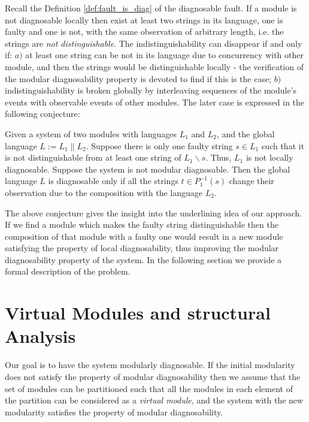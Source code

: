 \documentclass[letterpaper, 10pt, conference]{ieeeconf}
\begin{document}
Recall the Definition \ref{def:fault_is_diag} of the diagnosable fault. If a
module is not diagnosable locally then exist at least two strings in its
language, one is faulty and one is not, with the same observation of arbitrary
length, i.e. the strings are \emph{not distinguishable}. The
indistinguishability can disappear if and only if:
$a)$ at least one string can be not in its language due to concurrency with other
module, and then the strings would be distinguishable locally - the verification
of the modular diagnosability property is devoted to find if this is the case;
$b)$ indistinguishability is broken globally by interleaving sequences of the
module's events with observable events of other modules. The later case is
expressed in the following conjecture:
\begin{conjecture} Given a system of two modules with languages $L_1$ and $L_2$,
and the global language $L := L_1 \parallel L_2$. Suppose there is only
one faulty string $s \in L_1$ such that it is not distinguishable from at least one
string of $L_1\backslash s$. Thus, $L_1$ is not locally diagnosable. Suppose the
system is not modular diagnosable. Then the global language $L$ is diagnosable
only if all the strings $t \in P_1^{-1}(s)$ change their observation due to 
the composition with the language $L_2$.
\end{conjecture}

The above conjecture gives the insight into the underlining idea of our
approach. If we find a module which makes the faulty string distinguishable
then the composition of that module with a faulty one would result in a new
module satisfying the property of local diagnosability, thus improving
the modular diagnosability property of the system. In the following section we
provide a formal description of the problem.



\section{Virtual Modules and structural Analysis}
\label{sec:Proposal}

Our goal is to have the system modularly diagnosable. If the initial modularity
does not satisfy the property of modular diagnosability then we assume that the
set of modules can be partitioned such that all the modules in each
element of the partition can be considered as a \emph{virtual module}, and the
system with the new modularity satisfies the property of modular diagnosability.
\end{document}
